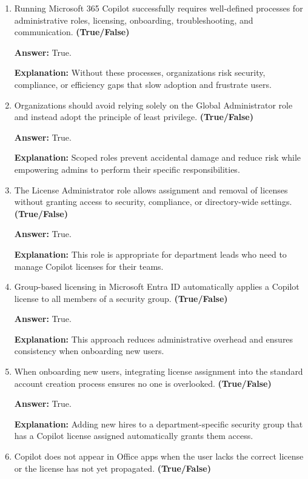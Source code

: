 \documentclass[10pt]{article}
\begin{document}
\begin{enumerate}[leftmargin=*]

\item Running Microsoft 365 Copilot successfully requires well-defined processes for administrative roles, licensing, onboarding, troubleshooting, and communication. \textbf{(True/False)}

\textbf{Answer:} True.

\textbf{Explanation:} Without these processes, organizations risk security, compliance, or efficiency gaps that slow adoption and frustrate users.

\item Organizations should avoid relying solely on the Global Administrator role and instead adopt the principle of least privilege. \textbf{(True/False)}

\textbf{Answer:} True.

\textbf{Explanation:} Scoped roles prevent accidental damage and reduce risk while empowering admins to perform their specific responsibilities.

\item The License Administrator role allows assignment and removal of licenses without granting access to security, compliance, or directory-wide settings. \textbf{(True/False)}

\textbf{Answer:} True.

\textbf{Explanation:} This role is appropriate for department leads who need to manage Copilot licenses for their teams.

\item Group-based licensing in Microsoft Entra ID automatically applies a Copilot license to all members of a security group. \textbf{(True/False)}

\textbf{Answer:} True.

\textbf{Explanation:} This approach reduces administrative overhead and ensures consistency when onboarding new users.

\item When onboarding new users, integrating license assignment into the standard account creation process ensures no one is overlooked. \textbf{(True/False)}

\textbf{Answer:} True.

\textbf{Explanation:} Adding new hires to a department-specific security group that has a Copilot license assigned automatically grants them access.

\item Copilot does not appear in Office apps when the user lacks the correct license or the license has not yet propagated. \textbf{(True/False)}


\end{enumerate}
\end{document}
